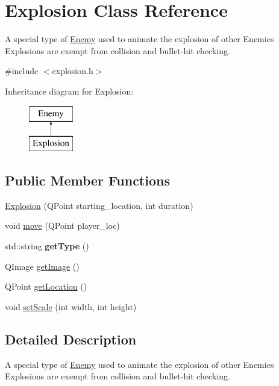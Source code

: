 \hypertarget{classExplosion}{
\section{Explosion Class Reference}
\label{classExplosion}
}


A special type of \hyperlink{classEnemy}{Enemy} used to animate the explosion of other Enemies Explosions are exempt from collision and bullet-\/hit checking.  




{\ttfamily \#include $<$explosion.h$>$}

Inheritance diagram for Explosion:\begin{figure}[H]
\begin{center}
\leavevmode
\includegraphics[height=2.000000cm]{classExplosion}
\end{center}
\end{figure}
\subsection*{Public Member Functions}
\begin{DoxyCompactItemize}
\item 
\hyperlink{classExplosion_aa8015e849906d4c37e0542047100c25b}{Explosion} (QPoint starting\_\-location, int duration)
\item 
void \hyperlink{classExplosion_a517d074124497b4c66503c3f2508e70e}{move} (QPoint player\_\-loc)
\item 
\hypertarget{classExplosion_a1ae628a63aa7ae66507b6795b6cd1c91}{
std::string {\bfseries getType} ()}
\label{classExplosion_a1ae628a63aa7ae66507b6795b6cd1c91}

\item 
QImage \hyperlink{classExplosion_a2bdd5e10ee21138e8a55550a31e4ff8d}{getImage} ()
\item 
QPoint \hyperlink{classExplosion_a4e0e5b7c19649b0e9ff7993dd19859d1}{getLocation} ()
\item 
void \hyperlink{classExplosion_ae66ab47347568858b246975d0da05a28}{setScale} (int width, int height)
\end{DoxyCompactItemize}


\subsection{Detailed Description}
A special type of \hyperlink{classEnemy}{Enemy} used to animate the explosion of other Enemies Explosions are exempt from collision and bullet-\/hit checking. 

